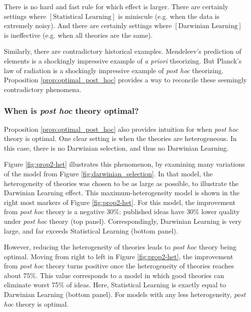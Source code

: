 \documentclass[12pt,english]{article}
\theoremstyle{plain}
\theoremstyle{plain}
\begin{document}
There is no hard and fast rule for which effect is larger. There are certainly settings where $\left[\text{Statistical Learning}\right]$ is miniscule (e.g. when the data is extremely noisy). And there are certainly settings where $\left[\text{Darwinian Learning}\right]$ is ineffective (e.g. when all theories are the same). 

Similarly, there are contradictory historical examples. Mendeleev's prediction of elements is a shockingly impressive example of \emph{a priori} theorizing. But Planck's law of radiation is a shockingly impressive example of \emph{post hoc} theorizing. Proposition \ref{prop:optimal_post_hoc} provides a way to reconcile these seemingly contradictory phenomena.


\subsubsection{When is \emph{post hoc} theory optimal?}\label{sec:het-figures}

Proposition \ref{prop:optimal_post_hoc} also provides intuition for when \emph{post hoc} theory is optimal. One clear setting is when the theories are heterogeneous. In this case, there is no Darwinian selection, and thus no Darwinian Learning. 

Figure \ref{fig:prop2-het} illustrates this phenomenon, by examining many variations of the model from Figure \ref{fig:darwinian_selection}. In that model, the heterogeneity of theories was chosen to be as large as possible, to illustrate the Darwinian Learning effect. This maximum-heterogeneity model is shown in the right most markers of Figure \ref{fig:prop2-het}. For this model, the improvement from \emph{post hoc} theory is a negative 30\%: published ideas have 30\% lower quality under \emph{post hoc} theory (top panel). Correspondingly, Darwinian Learning is very large, and far exceeds Statistical Learning (bottom panel).

However, reducing the heterogeneity of theories leads to \emph{post hoc} theory being optimal. Moving from right to left in Figure \ref{fig:prop2-het}, the improvement from \emph{post hoc} theory turns positive once the heterogeneity of theories reaches about 75\%. This value corresponds to a model in which good theories can eliminate worst 75\% of ideas. Here, Statistical Learning is exactly equal to Darwinian Learning (bottom panel). For models with any less heterogeneity, \emph{post hoc} theory is optimal.
\end{document}

